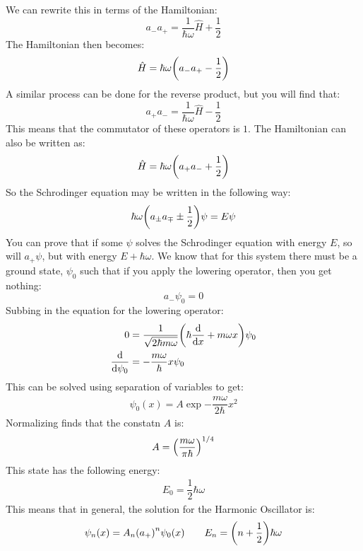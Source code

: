 We can rewrite this in terms of the Hamiltonian:
\begin{equation*}
  a_-a_+=\dfrac{1}{\hbar\omega}\hat{H}+\dfrac{1}{2}
\end{equation*}
The Hamiltonian then becomes:
\begin{equation*}
  \hat{H}=\hbar\omega\qty(a_-a_+-\dfrac{1}{2})
\end{equation*}
A similar process can be done for the reverse product, but you will find that:
\begin{equation*}
  a_+a_-=\dfrac{1}{\hbar\omega}\hat{H}-\dfrac{1}{2}
\end{equation*}
This means that the commutator of these operators is $1$. The Hamiltonian can also be written as:
\begin{equation*}
  \hat{H}=\hbar\omega\qty(a_+a_-+\dfrac{1}{2})
\end{equation*}
So the Schrodinger equation may be written in the following way:
\begin{equation*}
  \hbar\omega\qty(a_{\pm}a_{\mp}\pm\dfrac{1}{2})\psi=E\psi
\end{equation*}
You can prove that if some $\psi$ solves the Schrodinger equation with energy $E$, so will $a_+\psi$, but with energy $E+\hbar\omega$. We know that for this system there must be a ground state, $\psi_0$ such that if you apply the lowering operator, then you get nothing:
\begin{equation*}
  a_-\psi_0=0
\end{equation*}
Subbing in the equation for the lowering operator:
\begin{align*}
  0&=\dfrac{1}{\sqrt{2\hbar m\omega}}\qty(\hbar\dv{x}+m\omega x)\psi_0 \\
  \dv{\psi_0}&=-\dfrac{m\omega}{\hbar}x\psi_0
\end{align*}
This can be solved using separation of variables to get:
\begin{align*}
  \psi_0(x)=A\exp{-\dfrac{m\omega}{2\hbar}x^2}
\end{align*}
Normalizing finds that the constatn $A$ is:
\begin{align*}
  A=\qty(\dfrac{m\omega}{\pi\hbar})^{1/4}
\end{align*}
This state has the following energy:
\begin{align*}
  E_0=\dfrac{1}{2}\hbar\omega
\end{align*}
This means that in general, the solution for the Harmonic Oscillator is:
\begin{align*}
  \psi_n(x)=A_n\qty(a_+)^n\psi_0(x) \qquad E_n=\qty(n+\dfrac{1}{2})\hbar\omega
\end{align*}
